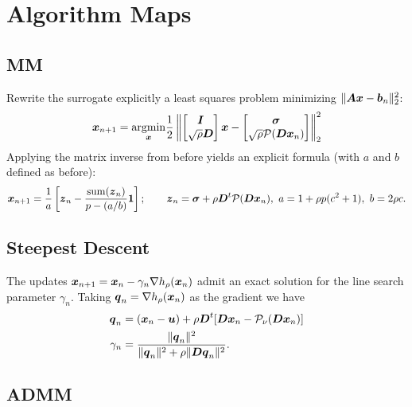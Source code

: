 \documentclass[11pt]{article}
\begin{document}
\section*{\center Algorithm Maps}

\subsection*{MM}
Rewrite the surrogate explicitly a least squares problem minimizing $\|\boldsymbol{A} \boldsymbol{x} - \boldsymbol{b}_{n}\|^{2}_{2}$:
\begin{equation*}
  \boldsymbol{x}_{n+1} = \underset{\boldsymbol{x}}{\mathop{\rm argmin}\nolimits} \frac{1}{2} \left\|
    \begin{bmatrix}
      \boldsymbol{I} \\
      \sqrt{\rho} \boldsymbol{D}
    \end{bmatrix} \boldsymbol{x}
    -
    \begin{bmatrix}
      \boldsymbol{\sigma} \\
      \sqrt{\rho} \mathcal{P}(\boldsymbol{D} \boldsymbol{x}_{n})
    \end{bmatrix}
  \right\|_{2}^{2}
\end{equation*}
Applying the matrix inverse from before yields an explicit formula (with $a$ and $b$ defined as before):
\begin{equation*}
    \boldsymbol{x}_{n+1}
    =
    \frac{1}{a}\left[
        \boldsymbol{z}_{n} - \frac{\mathrm{sum}(\boldsymbol{z}_{n})}{p - (a/b)} \boldsymbol{1}
    \right];
    \qquad
    \boldsymbol{z}_{n} = \boldsymbol{\sigma} + \rho \boldsymbol{D}^{t} \mathcal{P}(\boldsymbol{D} \boldsymbol{x}_{n}),
    ~a = 1 + \rho p (c^{2} + 1), ~b = 2 \rho c.
\end{equation*}

\subsection*{Steepest Descent}

The updates $\boldsymbol{x}_{n+1} = \boldsymbol{x}_{n} - \gamma_{n} \nabla h_{\rho}(\boldsymbol{x}_{n})$ admit an exact solution for the line search parameter $\gamma_{n}$.
Taking $\boldsymbol{q}_{n} = \nabla h_{\rho}(\boldsymbol{x}_{n})$ as the gradient we have
\begin{align*}
  \boldsymbol{q}_{n}
  &= (\boldsymbol{x}_{n} - \boldsymbol{u}) + \rho \boldsymbol{D}^{t} [\boldsymbol{D} \boldsymbol{x}_{n} - \mathcal{P}_{\nu}(\boldsymbol{D} \boldsymbol{x}_{n})] \\
  \gamma_{n}
  &=
  \frac{\|\boldsymbol{q}_{n}\|^{2}}{\|\boldsymbol{q}_{n}\|^{2} + \rho \|\boldsymbol{D} \boldsymbol{q}_{n}\|^{2}}.
\end{align*}

\subsection*{ADMM}
\end{document}
